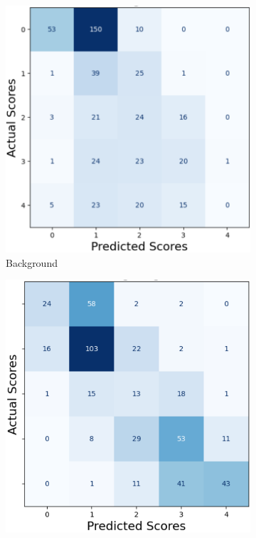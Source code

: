 \begin{figure}[ht]
    \centering
    \begin{subfigure}[b]{0.32\textwidth}
        \includegraphics[width=\textwidth]{img/cm/bg.png}
        \caption{Background}
        \label{fig:cm_bg}
    \end{subfigure}
    \hfill
    \begin{subfigure}[b]{0.32\textwidth}
        \includegraphics[width=\textwidth]{img/cm/light.png}

\end{subfigure}
\end{figure}
